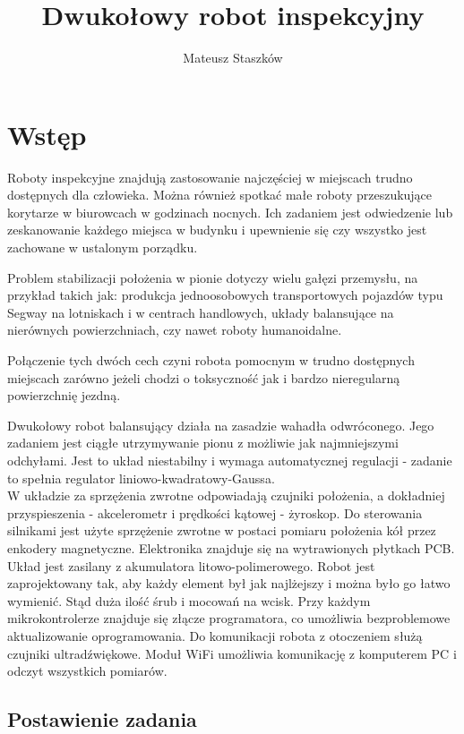 \documentclass[a4paper,12pt,twoside,openany]{report}
\title{Dwukołowy robot inspekcyjny}
\author{Mateusz Staszków}
\begin{document}
\maketitle

\chapter{Wstęp}

Roboty inspekcyjne znajdują zastosowanie najczęściej w miejscach trudno dostępnych dla człowieka. Można również spotkać małe roboty przeszukujące korytarze w biurowcach w godzinach nocnych. Ich zadaniem jest odwiedzenie lub zeskanowanie każdego miejsca w budynku i upewnienie się czy wszystko jest zachowane w ustalonym porządku.

Problem stabilizacji położenia w pionie dotyczy wielu gałęzi przemysłu, na przykład takich jak: produkcja jednoosobowych transportowych pojazdów typu Segway na lotniskach i w centrach handlowych, układy balansujące na nierównych powierzchniach, czy nawet roboty humanoidalne.

Połączenie tych dwóch cech czyni robota pomocnym w trudno dostępnych miejscach zarówno jeżeli chodzi o toksyczność jak i bardzo nieregularną powierzchnię jezdną.

Dwukołowy robot balansujący działa na zasadzie wahadła odwróconego. Jego zadaniem jest ciągłe utrzymywanie pionu z możliwie jak najmniejszymi odchyłami. Jest to układ niestabilny i wymaga automatycznej regulacji - zadanie to spełnia regulator liniowo-kwadratowy-Gaussa. \\
W układzie za sprzężenia zwrotne odpowiadają czujniki położenia, a dokładniej przyspieszenia - akcelerometr i prędkości kątowej - żyroskop. Do sterowania silnikami jest użyte sprzężenie zwrotne w postaci pomiaru położenia kół przez enkodery magnetyczne. Elektronika znajduje się na wytrawionych płytkach PCB. Układ jest zasilany z akumulatora litowo-polimerowego. Robot jest zaprojektowany tak, aby każdy element był jak najlżejszy i można było go łatwo wymienić. Stąd duża ilość śrub i mocowań na wcisk. Przy każdym mikrokontrolerze znajduje się złącze programatora, co umożliwia bezproblemowe aktualizowanie oprogramowania. Do komunikacji robota z otoczeniem służą czujniki ultradźwiękowe. Moduł WiFi umożliwia komunikację z komputerem PC i odczyt wszystkich pomiarów.

\section{Postawienie zadania}
\end{document}
